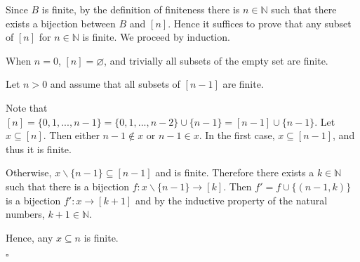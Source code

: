 \documentclass[11pt,journal]{IEEEtran}
\begin{document}
Since $B$ is finite, by the definition of finiteness there is $n \in \mathbb{N}$ such that there exists a bijection between $B$ and $[n]$. Hence it suffices to prove that any subset of $[n]$ for $n \in \mathbb{N}$ is finite. We proceed by induction.

When $n = 0$, $[n] = \varnothing$, and trivially all subsets of the empty set are finite.

Let $n > 0$ and assume that all subsets of $[n-1]$ are finite. 

Note that $[n] = \{0,1,...,n-1\} = \{0,1,...,n-2\} \cup \{n-1\} = [n-1] \cup \{n-1\}$. Let $x \subseteq [n]$. Then either $n-1 \notin x$ or $n-1\in x$. In the first case, $x \subseteq [n-1]$, and thus it is finite.

Otherwise, $x\backslash\{n-1\} \subseteq [n-1]$ and is finite. Therefore there exists a $k \in \mathbb{N}$ such that there is a bijection $f: x\backslash\{n-1\} \rightarrow [k]$. Then $f' = f \cup \{(n-1, k)\}$ is a bijection $f': x \rightarrow [k+1]$ and by the inductive property of the natural numbers, $k+1 \in \mathbb{N}$.

Hence, any $x \subseteq n$ is finite.

$\square$
	
\end{document}
